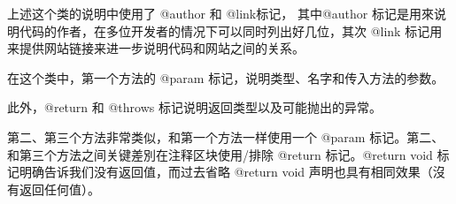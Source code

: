 上述这个类的说明中使用了 @author 和 @link标记， 其中@author 标记是用來说明代码的作者，在多位开发者的情况下可以同时列出好几位，其次 @link 标记用来提供网站链接来进一步说明代码和网站之间的关系。

在这个类中，第一个方法的 @param 标记，说明类型、名字和传入方法的参数。

此外，@return 和 @throws 标记说明返回类型以及可能抛出的异常。


第二、第三个方法非常类似，和第一个方法一样使用一个 @param 标记。第二、和第三个方法之间关键差別在注释区块使用/排除 @return 标记。@return void 标记明确告诉我们没有返回值，而过去省略 @return void 声明也具有相同效果（沒有返回任何值）。


